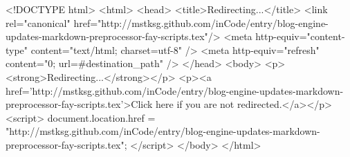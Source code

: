 <!DOCTYPE html>
<html>
<head>
<title>Redirecting...</title>
<link rel="canonical" href="http://mstksg.github.com/inCode/entry/blog-engine-updates-markdown-preprocessor-fay-scripts.tex"/>
<meta http-equiv="content-type" content="text/html; charset=utf-8" />
<meta http-equiv="refresh" content="0; url=#{destination_path}" />
</head>
<body>
  <p><strong>Redirecting...</strong></p>
  <p><a href='http://mstksg.github.com/inCode/entry/blog-engine-updates-markdown-preprocessor-fay-scripts.tex'>Click here if you are not redirected.</a></p>
  <script>
    document.location.href = "http://mstksg.github.com/inCode/entry/blog-engine-updates-markdown-preprocessor-fay-scripts.tex";
  </script>
</body>
</html>
